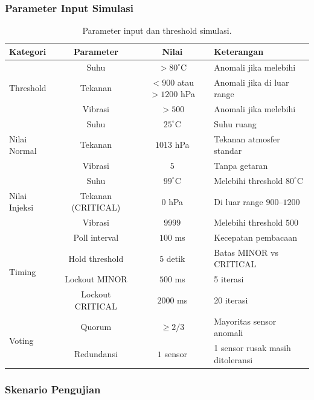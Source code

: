 \documentclass[12pt,a4paper]{article}
\begin{document}
\newpage

\subsubsection*{Parameter Input Simulasi}

\begin{table}[H]
\centering
\caption{Parameter input dan threshold simulasi.}
\label{tab:params}
\begin{tabular}{|l|c|c|l|}
\hline
\textbf{Kategori} & \textbf{Parameter} & \textbf{Nilai} & \textbf{Keterangan} \\
\hline
\multirow{3}{*}{Threshold} & Suhu & $>80^\circ$C & Anomali jika melebihi \\
& Tekanan & $<900$ atau $>1200$ hPa & Anomali jika di luar range \\
& Vibrasi & $>500$ & Anomali jika melebihi \\
\hline
\multirow{3}{*}{Nilai Normal} & Suhu & $25^\circ$C & Suhu ruang \\
& Tekanan & $1013$ hPa & Tekanan atmosfer standar \\
& Vibrasi & $5$ & Tanpa getaran \\
\hline
\multirow{3}{*}{Nilai Injeksi} & Suhu & $99^\circ$C & Melebihi threshold $80^\circ$C \\
& Tekanan (CRITICAL) & $0$ hPa & Di luar range $900$--$1200$ \\
& Vibrasi & $9999$ & Melebihi threshold $500$ \\
\hline
\multirow{4}{*}{Timing} & Poll interval & $100$ ms & Kecepatan pembacaan \\
& Hold threshold & $5$ detik & Batas MINOR vs CRITICAL \\
& Lockout MINOR & $500$ ms & 5 iterasi \\
& Lockout CRITICAL & $2000$ ms & 20 iterasi \\
\hline
\multirow{2}{*}{Voting} & Quorum & $\geq 2/3$ & Mayoritas sensor anomali \\
& Redundansi & $1$ sensor & 1 sensor rusak masih ditoleransi \\
\hline
\end{tabular}
\end{table}

\vspace{0.3cm}

\subsubsection*{Skenario Pengujian}
\end{document}
